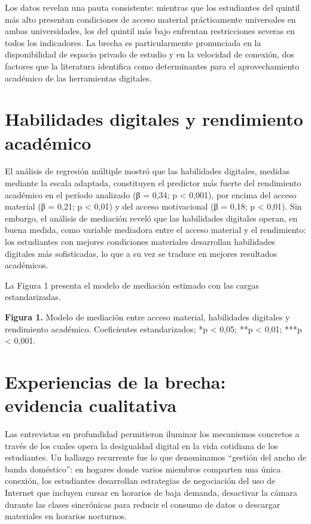 \documentclass{article}
\begin{document}
Los datos revelan una pauta consistente: mientras que los estudiantes del quintil más alto presentan condiciones de acceso material prácticamente universales en ambas universidades, los del quintil más bajo enfrentan restricciones severas en todos los indicadores. La brecha es particularmente pronunciada en la disponibilidad de espacio privado de estudio y en la velocidad de conexión, dos factores que la literatura identifica como determinantes para el aprovechamiento académico de las herramientas digitales.


\section{Habilidades digitales y rendimiento académico}
El análisis de regresión múltiple mostró que las habilidades digitales, medidas mediante la escala adaptada, constituyen el predictor más fuerte del rendimiento académico en el período analizado (β = 0,34; p < 0,001), por encima del acceso material (β = 0,21; p < 0,01) y del acceso motivacional (β = 0,18; p < 0,01). Sin embargo, el análisis de mediación reveló que las habilidades digitales operan, en buena medida, como variable mediadora entre el acceso material y el rendimiento: los estudiantes con mejores condiciones materiales desarrollan habilidades digitales más sofisticadas, lo que a su vez se traduce en mejores resultados académicos.

La Figura 1 presenta el modelo de mediación estimado con las cargas estandarizadas.


\begin{tcolorbox}[colback=white,colframe=azulrevista,leftrule=3pt,rightrule=0pt,toprule=0pt,bottomrule=0pt,arc=0pt,left=8pt,right=4pt,top=3pt,bottom=3pt,before skip=4pt,after skip=4pt]
{\sffamily\small
\textbf{Figura 1.} Modelo de mediación entre acceso material, habilidades digitales y rendimiento académico. Coeficientes estandarizados; *p < 0,05; **p < 0,01; ***p < 0,001.

}
\end{tcolorbox}


\section{Experiencias de la brecha: evidencia cualitativa}
Las entrevistas en profundidad permitieron iluminar los mecanismos concretos a través de los cuales opera la desigualdad digital en la vida cotidiana de los estudiantes. Un hallazgo recurrente fue lo que denominamos “gestión del ancho de banda doméstico”: en hogares donde varios miembros comparten una única conexión, los estudiantes desarrollan estrategias de negociación del uso de Internet que incluyen cursar en horarios de baja demanda, desactivar la cámara durante las clases sincrónicas para reducir el consumo de datos o descargar materiales en horarios nocturnos.
\end{document}
